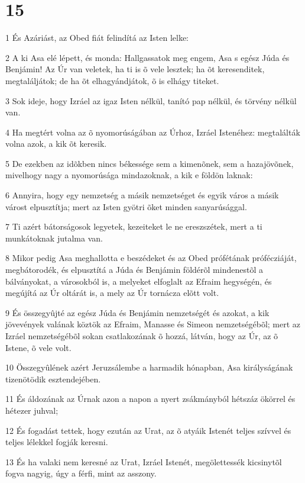 \chapter{15}

\par 1 És Azáriást, az Obed fiát felindítá az Isten lelke:
\par 2 A ki Asa elé lépett, és monda: Hallgassatok meg engem, Asa s egész Júda és Benjámin! Az Úr van veletek, ha ti is õ vele lesztek; ha õt keresenditek, megtaláljátok; de ha õt elhagyándjátok, õ is elhágy titeket.
\par 3 Sok ideje, hogy Izráel az igaz Isten nélkül, tanító pap nélkül, és törvény nélkül van.
\par 4 Ha megtért volna az õ nyomorúságában az Úrhoz, Izráel Istenéhez: megtalálták volna azok, a kik õt keresik.
\par 5 De ezekben az idõkben nincs békessége sem a kimenõnek, sem a hazajövõnek, mivelhogy nagy a nyomorúsága mindazoknak, a kik e földön laknak:
\par 6 Annyira, hogy egy nemzetség a másik nemzetséget és egyik város a másik várost elpusztítja; mert az Isten gyötri õket minden sanyarúsággal.
\par 7 Ti azért bátorságosok legyetek, kezeiteket le ne ereszszétek, mert a ti munkátoknak jutalma van.
\par 8 Mikor pedig Asa meghallotta e beszédeket és az Obed prófétának prófécziáját, megbátorodék, és elpusztítá a Júda és Benjámin földérõl mindenestõl a bálványokat, a városokból is, a melyeket elfoglalt az Efraim hegységén, és megújítá az Úr oltárát is, a mely az Úr tornácza elõtt volt.
\par 9 És összegyûjté az egész Júda és Benjámin nemzetségét és azokat, a kik jövevények valának köztök az Efraim, Manasse és Simeon nemzetségébõl; mert az Izráel nemzetségébõl sokan csatlakozának õ hozzá, látván, hogy az Úr, az õ Istene, õ vele volt.
\par 10 Összegyûlének azért Jeruzsálembe a harmadik hónapban, Asa királyságának tizenötödik esztendejében.
\par 11 És áldozának az Úrnak azon a napon a nyert zsákmányból hétszáz ökörrel és hétezer juhval;
\par 12 És fogadást tettek, hogy ezután az Urat, az õ atyáik Istenét teljes szívvel és teljes lélekkel fogják keresni.
\par 13 És ha valaki nem keresné az Urat, Izráel Istenét, megölettessék kicsinytõl fogva nagyig, úgy a férfi, mint az asszony.
